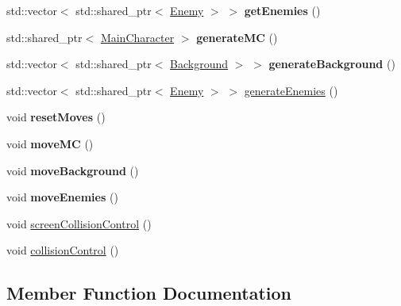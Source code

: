 \begin{DoxyCompactItemize}
\item 
\mbox{\label{class_model_ad2adcd81ad4cdd73b3db10a4e807caf4}} 
std\+::vector$<$ std\+::shared\+\_\+ptr$<$ \hyperlink{class_enemy}{Enemy} $>$ $>$ {\bfseries get\+Enemies} ()
\item 
\mbox{\label{class_model_ad95392ecd55444f93ca2f471f2c97b09}} 
std\+::shared\+\_\+ptr$<$ \hyperlink{class_main_character}{Main\+Character} $>$ {\bfseries generate\+MC} ()
\item 
\mbox{\label{class_model_ab50b67ca385d1ab402ded5ecec7b96cc}} 
std\+::vector$<$ std\+::shared\+\_\+ptr$<$ \hyperlink{class_background}{Background} $>$ $>$ {\bfseries generate\+Background} ()
\item 
std\+::vector$<$ std\+::shared\+\_\+ptr$<$ \hyperlink{class_enemy}{Enemy} $>$ $>$ \hyperlink{class_model_a37263d57b165877f36157a9538c0b96b}{generate\+Enemies} ()
\item 
\mbox{\label{class_model_af6ca3e8ebb3b6ac3a0d0d413e33e8693}} 
void {\bfseries reset\+Moves} ()
\item 
\mbox{\label{class_model_ae330be8cd03370cc346432543b361c35}} 
void {\bfseries move\+MC} ()
\item 
\mbox{\label{class_model_ad7a90c028065c2baa83ee34904c3ded7}} 
void {\bfseries move\+Background} ()
\item 
\mbox{\label{class_model_aa8caf28eae1565d64633db18b0f4f5a6}} 
void {\bfseries move\+Enemies} ()
\item 
void \hyperlink{class_model_a342131d5e48ed3ab8d59f9b19c7f759a}{screen\+Collision\+Control} ()
\item 
void \hyperlink{class_model_a66849d75ce129d37a71eeec94e4b6d3d}{collision\+Control} ()
\end{DoxyCompactItemize}


\subsection{Member Function Documentation}
\mbox{\label{class_model_a66849d75ce129d37a71eeec94e4b6d3d}} 
